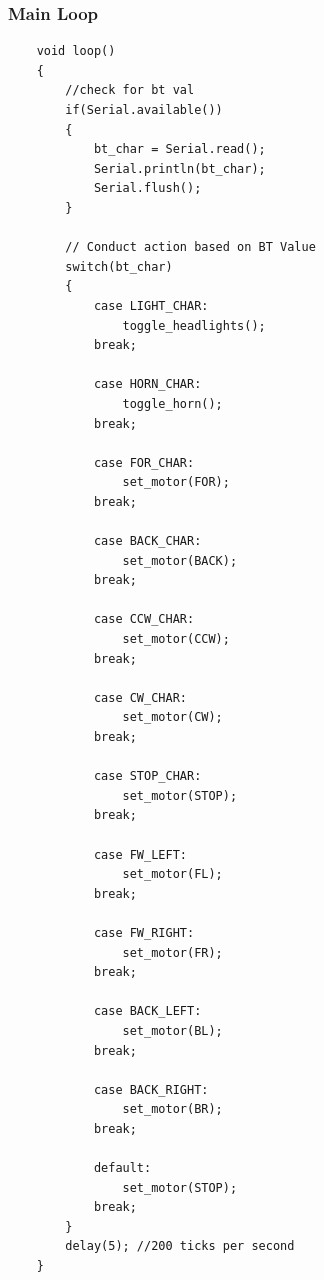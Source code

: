 \documentclass{article}
\begin{document}
	\subsubsection*{Main Loop}
	\begin{lstlisting}
	void loop() 
	{
		//check for bt val
		if(Serial.available())
		{
			bt_char = Serial.read();
			Serial.println(bt_char);
			Serial.flush();
		}
		
		// Conduct action based on BT Value
		switch(bt_char)
		{
			case LIGHT_CHAR:
				toggle_headlights();
			break;
			
			case HORN_CHAR:
				toggle_horn();
			break;
			
			case FOR_CHAR:
				set_motor(FOR);
			break;
			
			case BACK_CHAR:
				set_motor(BACK);
			break;
			
			case CCW_CHAR:
				set_motor(CCW);
			break;
			
			case CW_CHAR:
				set_motor(CW);
			break;
			
			case STOP_CHAR:
				set_motor(STOP);
			break;
			
			case FW_LEFT:
				set_motor(FL);
			break;
			
			case FW_RIGHT:
				set_motor(FR);
			break;
			
			case BACK_LEFT:
				set_motor(BL);
			break;
			
			case BACK_RIGHT:
				set_motor(BR);
			break;
			
			default:
				set_motor(STOP);
			break;
		}
		delay(5); //200 ticks per second
	}
		
	\end{lstlisting}
	
\end{document}
